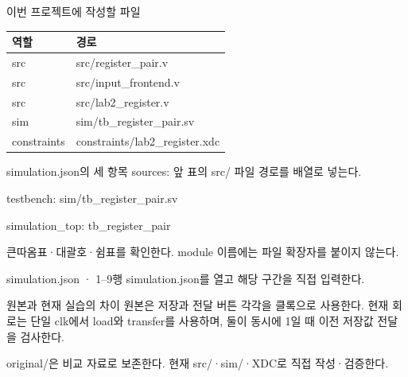 \begin{frame}{이번 프로젝트에 작성할 파일}
\small
\begin{center}\renewcommand{\arraystretch}{1.55}\begin{tabular}{ll}
역할 & 경로\\\hline
src & src/register\_pair.v\\
src & src/input\_frontend.v\\
src & src/lab2\_register.v\\
sim & sim/tb\_register\_pair.sv\\
constraints & constraints/lab2\_register.xdc\\
\end{tabular}\end{center}
\end{frame}

\begin{frame}{simulation.json의 세 항목}
\small
sources: 앞 표의 src/ 파일 경로를 배열로 넣는다.\par\vspace{0.26cm}testbench: sim/tb\_register\_pair.sv\par\vspace{0.26cm}simulation\_top: tb\_register\_pair\par\vspace{0.26cm}큰따옴표·대괄호·쉼표를 확인한다. module 이름에는 파일 확장자를 붙이지 않는다.\par
\end{frame}

\begin{frame}{simulation.json · 1–9행}
\small
simulation.json를 열고 해당 구간을 직접 입력한다.\par\vspace{0.4cm}\par\vspace{0.4cm}
\end{frame}

\begin{frame}{원본과 현재 실습의 차이}
\small
원본은 저장과 전달 버튼 각각을 클록으로 사용한다. 현재 회로는 단일 clk에서 load와 transfer를 사용하며, 둘이 동시에 1일 때 이전 저장값 전달을 검사한다.\par\vspace{0.26cm}original/은 비교 자료로 보존한다. 현재 src/·sim/·XDC로 직접 작성·검증한다.\par
\end{frame}

